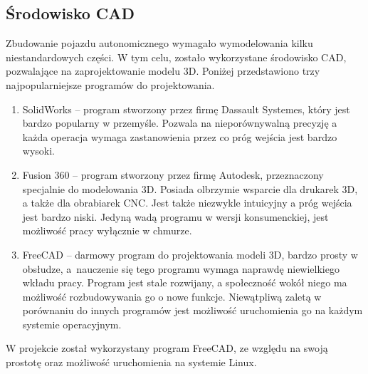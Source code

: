     \subsection{Środowisko CAD}
        Zbudowanie pojazdu autonomicznego wymagało wymodelowania kilku niestandardowych części.
        W tym celu, zostało wykorzystane środowisko CAD, pozwalające na zaprojektowanie modelu 3D.
        Poniżej przedstawiono trzy najpopularniejsze programów do projektowania.
        \begin{enumerate}
            \item SolidWorks -- program stworzony przez firmę Dassault Systemes, który jest bardzo popularny w przemyśle.
            Pozwala na nieporównywalną precyzję a każda operacja wymaga zastanowienia przez co próg wejścia jest bardzo wysoki.
            \item Fusion 360 -- program stworzony przez firmę Autodesk, przeznaczony specjalnie do modelowania 3D.
            Posiada olbrzymie wsparcie dla drukarek 3D, a także dla obrabiarek CNC.
            Jest także niezwykle intuicyjny a próg wejścia jest bardzo niski.
            Jedyną wadą programu w wersji konsumenckiej, jest możliwość pracy wyłącznie w chmurze.
            \item FreeCAD -- darmowy program do projektowania modeli 3D, bardzo prosty w obsłudze, a~nauczenie się tego programu wymaga naprawdę niewielkiego wkładu pracy.
            Program jest stale rozwijany, a społeczność wokół niego ma możliwość rozbudowywania go o nowe funkcje.
            Niewątpliwą zaletą w porównaniu do innych programów jest możliwość uruchomienia go na każdym systemie operacyjnym.
        \end{enumerate}

        W projekcie został wykorzystany program FreeCAD, ze względu na swoją prostotę oraz możliwość uruchomienia na systemie Linux.

